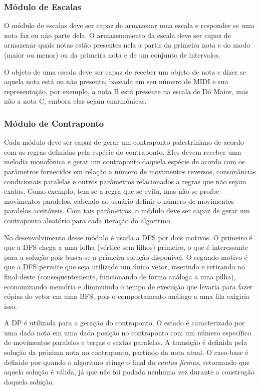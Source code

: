     \subsubsection[Módulo de Escalas]{Módulo de Escalas}

      O módulo de escalas deve ser capaz de armazenar uma escala e responder se uma nota faz ou não parte dela. O armazenamento da escala deve ser capaz de armazenar quais notas estão presentes nela a partir da primeira nota e do modo (maior ou menor) ou da primeira nota e de um conjunto de intervalos.

      O objeto de uma escala deve ser capaz de receber um objeto de nota e dizer se aquela nota está ou não presente, baseada em seu número de MIDI e sua representação, por exemplo, a nota B está presente na escala de Dó Maior, mas não a nota C\fl{}, embora elas sejam enarmônicas.

    \subsubsection[Módulos de Contraponto]{Módulo de Contraponto}

      Cada módulo deve ser capaz de gerar um contraponto palestriniano de acordo com as regras definidas pela espécie do contraponto. Eles devem receber uma melodia monofônica e gerar um contraponto daquela espécie de acordo com os parâmetros fornecidos em relação a número de movimentos reversos, consonâncias condicionais paralelas e outros parâmetros relacionados a regras que não sejam exatas. Como exemplo, tem-se a regra que se evita, mas não se proíbe movimentos paralelos, cabendo ao usuário definir o número de movimentos paralelos aceitáveis. Com tais parâmetros, o módulo deve ser capaz de gerar um contraponto aleatório para cada iteração do algoritmo.

      No desenvolvimento desse módulo é usada a DFS por dois motivos. O primeiro é que a DFS chega a uma folha (vértice sem filhos) primeiro, o que é interessante para a solução pois busca-se a primeira solução disponível. O segundo motivo é que a DFS permite que seja utilizado um único vetor, inserindo e retirando no final deste (consequentemente, funcionando de forma análoga a uma pilha), economizando memória e diminuindo o tempo de execução que levaria para fazer cópias do vetor em uma BFS, pois o comportamento análogo a uma fila exigiria isso.

      A DP é utilizada para a geração do contraponto. O estado é caracterizado por uma dada nota em uma dada posição no contraponto com um número específico de movimentos paralelos e terças e sextas paralelas. A transição é definida pela solução da próxima nota no contraponto, partindo da nota atual. O caso-base é definido por quando o algoritmo atinge o final do \textit{cantus firmus}, retornando que aquela solução é válida, já que não foi podada nenhuma vez durante a construção daquela solução.

